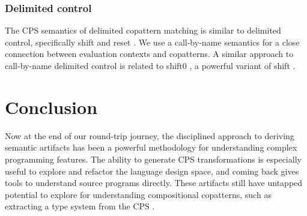 \documentclass[sigplan,screen]{acmart}
\begin{document}
\subsubsection*{Delimited control}
%
The CPS semantics of delimited copattern matching is similar to delimited
control, specifically shift and reset
\cite{FunctionalAbstractionTypedContexts,AbstractingControl}.  We use a
call-by-name semantics for a close connection between evaluation contexts and
copatterns.  A similar approach to call-by-name delimited control
\cite{HerbelinG08} is related to shift0 \cite{DownenAriola2014CSCC}, a powerful
variant of shift \cite{materzok2011subtyping,materzok2012dynamic}.

\section{Conclusion}
\label{sec:conclusion}

Now at the end of our round-trip journey, the disciplined approach to deriving
semantic artifacts has been a powerful methodology for understanding complex
programming features.  The ability to generate CPS transformations is especially
useful to explore and refactor the language design space, and coming back gives
tools to understand source programs directly.  These artifacts still have
untapped potential to explore for understanding compositional copatterns, such
as extracting a type system from the CPS
\cite{FunctionalAbstractionTypedContexts}.









\appendix


\end{document}
